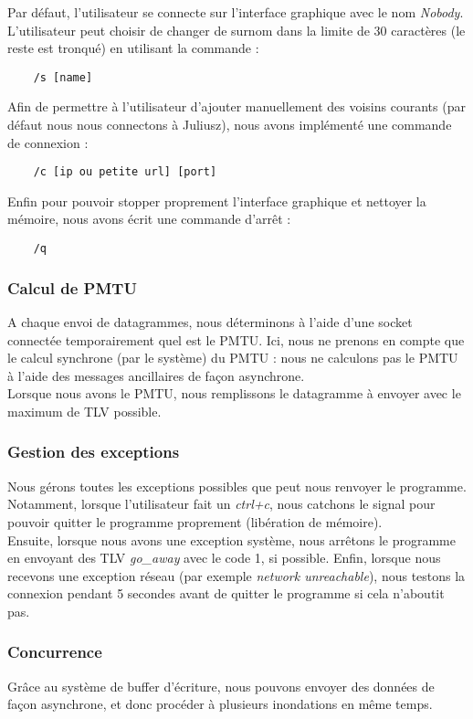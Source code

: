 \documentclass{FR16}
\begin{document}
Par défaut, l'utilisateur se connecte sur l'interface graphique avec le nom \textit{Nobody}. L'utilisateur peut choisir de changer de surnom dans la limite de 30 caractères (le reste est tronqué) en utilisant la commande :
\begin{verbatim}
    /s [name]
\end{verbatim}

Afin de permettre à l'utilisateur d'ajouter manuellement des voisins courants (par défaut nous nous connectons à Juliusz), nous avons implémenté une commande de connexion :
\begin{verbatim}
    /c [ip ou petite url] [port]
\end{verbatim}

Enfin pour pouvoir stopper proprement l'interface graphique et nettoyer la mémoire, nous avons écrit une commande d'arrêt :
\begin{verbatim}
    /q
\end{verbatim}

\subsubsection{Calcul de PMTU}
A chaque envoi de datagrammes, nous déterminons à l'aide d'une socket connectée temporairement quel est le PMTU. Ici, nous ne prenons en compte que le calcul synchrone (par le système) du PMTU : nous ne calculons pas le PMTU à l'aide des messages ancillaires de façon asynchrone.\\
Lorsque nous avons le PMTU, nous remplissons le datagramme à envoyer avec le maximum de TLV possible.
\subsubsection{Gestion des exceptions}
Nous gérons toutes les exceptions possibles que peut nous renvoyer le programme. Notamment, lorsque l'utilisateur fait un \textit{ctrl+c}, nous catchons le signal pour pouvoir quitter le programme proprement (libération de mémoire).\\
Ensuite, lorsque nous avons une exception système, nous arrêtons le programme en envoyant des TLV \textit{go\_away} avec le code 1, si possible. Enfin, lorsque nous recevons une exception réseau (par exemple \textit{network unreachable}), nous testons la connexion pendant 5 secondes avant de quitter le programme si cela n'aboutit pas.
\subsubsection{Concurrence}
Grâce au système de buffer d'écriture, nous pouvons envoyer des données de façon asynchrone, et donc procéder à plusieurs inondations en même temps.
\end{document}
